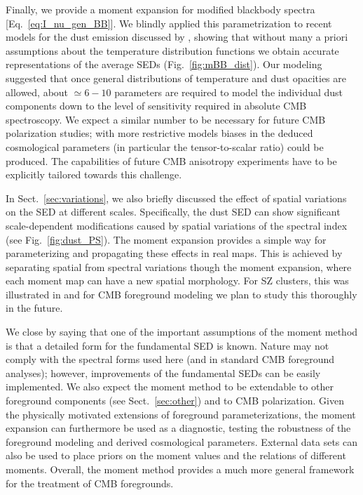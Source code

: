 \documentclass[usenatbib]{mn2e}
\begin{document}
Finally, we provide a moment expansion for modified blackbody spectra [Eq.~\eqref{eq:I_nu_gen_BB}]. We blindly applied this parametrization to recent models for the dust emission discussed by \citet{Kogut2016}, showing that without many a priori assumptions about the temperature distribution functions we obtain accurate representations of the average SEDs (Fig.~\ref{fig:mBB_dist}). Our modeling suggested that once general distributions of temperature and dust opacities are allowed, about $\simeq 6-10$ parameters are required to model the individual dust components down to the level of sensitivity required in absolute CMB spectroscopy. We expect a similar number to be necessary for future CMB polarization studies; with more restrictive models biases in the deduced cosmological parameters (in particular the tensor-to-scalar ratio) could be produced. The capabilities of future CMB anisotropy experiments have to be explicitly tailored towards this challenge.

In Sect.~\ref{sec:variations}, we also briefly discussed the effect of spatial variations on the SED at different scales. Specifically, the dust SED can show significant scale-dependent modifications caused by spatial variations of the spectral index (see Fig.~\ref{fig:dust_PS}). The moment expansion provides a simple way for parameterizing and propagating these effects in real maps. This is achieved by separating spatial from spectral variations though the moment expansion, where each moment map can have a new spatial morphology. For SZ clusters, this was illustrated in \citet{Chluba2012moments} and for CMB foreground modeling we plan to study this thoroughly in the future.

We close by saying that one of the important assumptions of the moment method is that a detailed form for the fundamental SED is known. Nature may not comply with the spectral forms used here (and in standard CMB foreground analyses); however, improvements of the fundamental SEDs can be easily implemented. We also expect the moment method to be extendable to other foreground components (see Sect.~\ref{sec:other}) and to CMB polarization. Given the physically motivated extensions of foreground parameterizations, the moment expansion can furthermore be used as a diagnostic, testing the robustness of the foreground modeling and derived cosmological parameters. External data sets can also be used to place priors on the moment values and the relations of different moments. 
%
Overall, the moment method provides a much more general framework for the treatment of CMB foregrounds.
  
\end{document}
